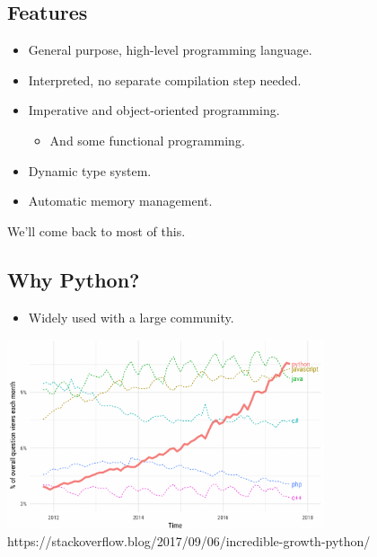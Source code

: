 \documentclass[aspectratio=1610,slidestop]{beamer}
\begin{document}
\subsection{Features}
\begin{pframe}
 \begin{itemize}
  \item General purpose, high-level programming language.
  \item Interpreted, no separate compilation step needed.
  \item Imperative and object-oriented programming.
  \begin{itemize}
   \item And some functional programming.
  \end{itemize}
  \item Dynamic type system.
  \item Automatic memory management.
 \end{itemize}
 We'll come back to most of this.
\end{pframe}


\subsection{Why Python?}
\begin{pframe}
 \begin{itemize}
  \item Widely used with a large community.
 \end{itemize}
 \vspace{-0.5cm}
 \begin{center}
  \includegraphics[width=0.70\textwidth]{../../images/growth_major_languages-1-1024x878_stackoverflow_c.png}
  \tiny{https://stackoverflow.blog/2017/09/06/incredible-growth-python/}
 \end{center}
\end{pframe}
\end{document}
